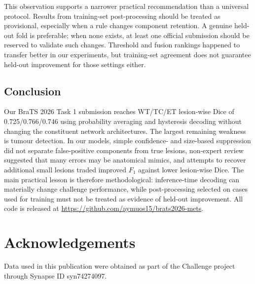 \documentclass[runningheads]{llncs}
\begin{document}
This observation supports a narrower practical recommendation than a universal protocol. Results
from training-set post-processing should be treated as provisional, especially when a rule changes
component retention. A genuine held-out fold is preferable; when none exists, at least one official
submission should be reserved to validate such changes. Threshold and fusion rankings happened to
transfer better in our experiments, but training-set agreement does not guarantee held-out
improvement for those settings either.

\subsection{Conclusion}
\label{sec:conclusion}

Our BraTS 2026 Task 1 submission reaches WT/TC/ET lesion-wise Dice of
0.725/0.766/0.746 using probability averaging and hysteresis decoding without changing the
constituent network architectures. The largest remaining weakness is tumour detection. In our
models, simple confidence- and size-based suppression did not separate false-positive components
from true lesions, non-expert review suggested that many errors may be anatomical mimics, and
attempts to recover additional small lesions traded improved $F_1$ against lower lesion-wise Dice.
The main practical lesson is therefore methodological: inference-time decoding can materially
change challenge performance, while post-processing selected on cases used for training must not
be treated as evidence of held-out improvement. All code is released at
\url{https://github.com/aymuos15/brats2026-mets}.

\section*{Acknowledgements}
Data used in this publication were obtained as part of the Challenge project through Synapse ID
syn74274097.
\end{document}
